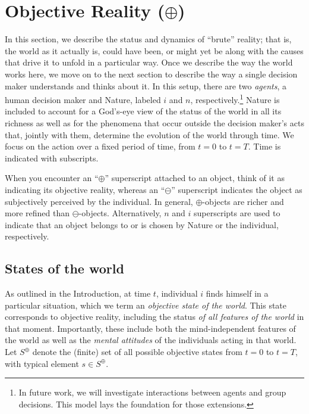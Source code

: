 \documentclass[
11pt,
titlepage,
reqno,
]{article}%
\theoremstyle{definition}
\begin{document}
	
\section{Objective Reality ($\oplus$)}\label{sec:world}
	
In this section, we describe the status and dynamics of ``brute'' reality; that is, the world as it actually is, could have been, or might yet be along with the causes that drive it to unfold in a particular way. 
Once we describe the way the world works here, we move on to the next section to describe the way a single decision maker understands and thinks about it.
In this setup, there are two \textit{agents}, a human decision maker and Nature, labeled $i$ and $n$, respectively.\footnote
{
	In future work, we will investigate interactions between agents and group decisions.
		This model lays the foundation for those extensions.
} 
Nature is included to account for  a God's-eye view of the status of the world in all its richness as well as for the phenomena that occur outside the decision maker's acts that, jointly with them, determine the evolution of the world through time.
We focus on the action over a fixed period of time, from $t=0$ to $t=T$. 
Time is indicated with subscripts.
	
When you encounter an ``$\oplus$'' superscript attached to an object, think of it as indicating its objective reality, whereas an ``$\ominus$'' superscript indicates the object as subjectively perceived by the individual.
In general, $\oplus$-objects are richer and more refined than $\ominus$-objects. 
Alternatively, $n$ and $i$ superscripts are used to indicate that an object belongs to or is chosen by Nature or the individual, respectively.
	
	
	
	
\subsection{States of the world\label{sec:states}}
	
As outlined in the Introduction, at time $t$, individual $i$ finds himself in a particular situation, which we term an \textit{objective state of the world}.
This state corresponds to objective reality, including the status \textit{of all features of the world} in that moment. 
Importantly, these include both the  mind-independent features of the world as well as the \textit{mental attitudes} of the individuals acting in that world. 
Let $S^\oplus$ denote the (finite) set of all possible objective states from $t=0$ to $t=T$, with typical element $s\in S^\oplus$.
\end{document}
